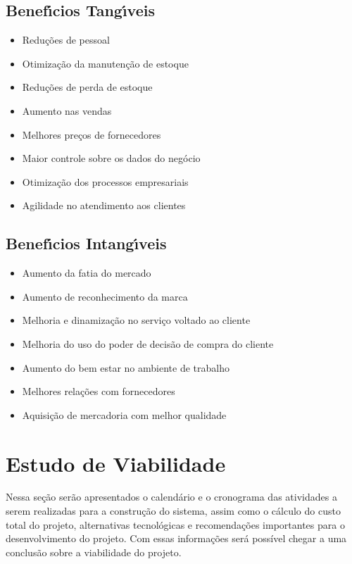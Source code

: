        \subsection{Benef\'{\i}cios Tang\'{\i}veis}
       	\begin{itemize}
	\item Reduções de pessoal 
	\item Otimização da manutenção de estoque
	\item Reduções de perda de estoque %
	\item Aumento nas vendas 
	\item Melhores preços de fornecedores 
	\item Maior controle sobre os dados do negócio %
	\item Otimização dos processos empresariais 
	\item Agilidade no atendimento aos clientes
        	\end{itemize}

       \subsection{Benef\'{\i}cios Intang\'{\i}veis}
	\begin{itemize}
	\item Aumento da fatia do mercado
	\item Aumento de reconhecimento da marca 
	\item Melhoria e dinamização no serviço voltado ao cliente
	\item Melhoria do uso do poder de decisão de compra do cliente 
	\item Aumento do bem estar no ambiente de trabalho 
	\item Melhores relações com fornecedores
	\item Aquisição de mercadoria com melhor qualidade
         	\end{itemize}

\section{Estudo de Viabilidade}
Nessa seção serão apresentados o calendário e o cronograma das atividades a serem realizadas para a construção do sistema, assim como o cálculo do custo total do projeto, alternativas tecnológicas e recomendações importantes para o desenvolvimento do projeto. Com essas informações será possível chegar a uma conclusão sobre a viabilidade do projeto.

